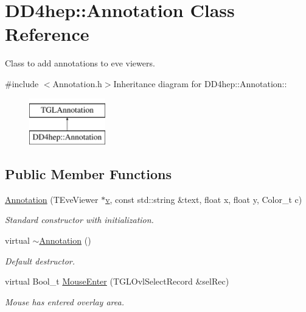 \hypertarget{class_d_d4hep_1_1_annotation}{
\section{DD4hep::Annotation Class Reference}
\label{class_d_d4hep_1_1_annotation}
}


Class to add annotations to eve viewers.  


{\ttfamily \#include $<$Annotation.h$>$}Inheritance diagram for DD4hep::Annotation::\begin{figure}[H]
\begin{center}
\leavevmode
\includegraphics[height=2cm]{class_d_d4hep_1_1_annotation}
\end{center}
\end{figure}
\subsection*{Public Member Functions}
\begin{DoxyCompactItemize}
\item 
\hyperlink{class_d_d4hep_1_1_annotation_a8b1b5f5ca85400bf6f580a91f6e7cebc}{Annotation} (TEveViewer $\ast$\hyperlink{_multi_view_8cpp_a8320ee13ac034dbf6d624fe8953dd337}{v}, const std::string \&text, float x, float y, Color\_\-t c)
\begin{DoxyCompactList}\small\item\em Standard constructor with initialization. \item\end{DoxyCompactList}\item 
virtual \hyperlink{class_d_d4hep_1_1_annotation_a95144855eb445040d47951c668dc5764}{$\sim$Annotation} ()
\begin{DoxyCompactList}\small\item\em Default destructor. \item\end{DoxyCompactList}\item 
virtual Bool\_\-t \hyperlink{class_d_d4hep_1_1_annotation_a08d3cc154321a9410f62e38d42a918f0}{MouseEnter} (TGLOvlSelectRecord \&selRec)
\begin{DoxyCompactList}\small\item\em Mouse has entered overlay area. \item\end{DoxyCompactList}\end{DoxyCompactItemize}
